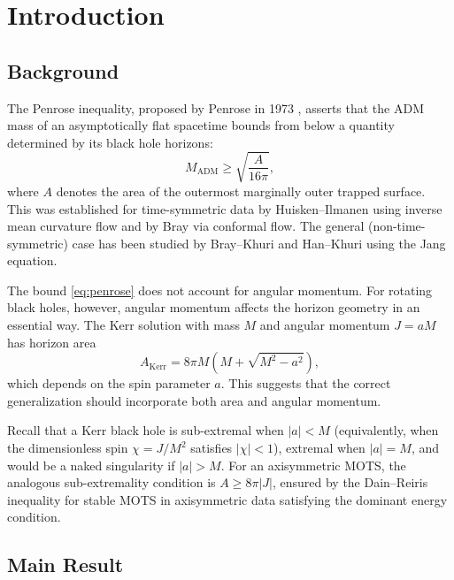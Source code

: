 \documentclass[12pt]{article}
\theoremstyle{plain}
\theoremstyle{definition}
\theoremstyle{remark}
\newcommand{\ADM}{\mathrm{ADM}}
\begin{document}
\tableofcontents

\section{Introduction}

\subsection{Background}

The Penrose inequality, proposed by Penrose in 1973 \cite{penrose1973}, asserts that the ADM mass of an asymptotically flat spacetime bounds from below a quantity determined by its black hole horizons:
\begin{equation}\label{eq:penrose}
    M_{\ADM} \geq \sqrt{\frac{A}{16\pi}},
\end{equation}
where $A$ denotes the area of the outermost marginally outer trapped surface. This was established for time-symmetric data by Huisken--Ilmanen \cite{huisken2001} using inverse mean curvature flow and by Bray \cite{bray2001} via conformal flow. The general (non-time-symmetric) case has been studied by Bray--Khuri \cite{braykhuri2010} and Han--Khuri \cite{hankhuri2013} using the Jang equation.

The bound \eqref{eq:penrose} does not account for angular momentum. For rotating black holes, however, angular momentum affects the horizon geometry in an essential way. The Kerr solution with mass $M$ and angular momentum $J = aM$ has horizon area
\[
A_{\text{Kerr}} = 8\pi M(M + \sqrt{M^2 - a^2}),
\]
which depends on the spin parameter $a$. This suggests that the correct generalization should incorporate both area and angular momentum.

Recall that a Kerr black hole is sub-extremal when $|a| < M$ (equivalently, when the dimensionless spin $\chi = J/M^2$ satisfies $|\chi| < 1$), extremal when $|a| = M$, and would be a naked singularity if $|a| > M$. For an axisymmetric MOTS, the analogous sub-extremality condition is $A \geq 8\pi|J|$, ensured by the Dain--Reiris inequality \cite{dain2011} for stable MOTS in axisymmetric data satisfying the dominant energy condition.

\subsection{Main Result}
\end{document}
